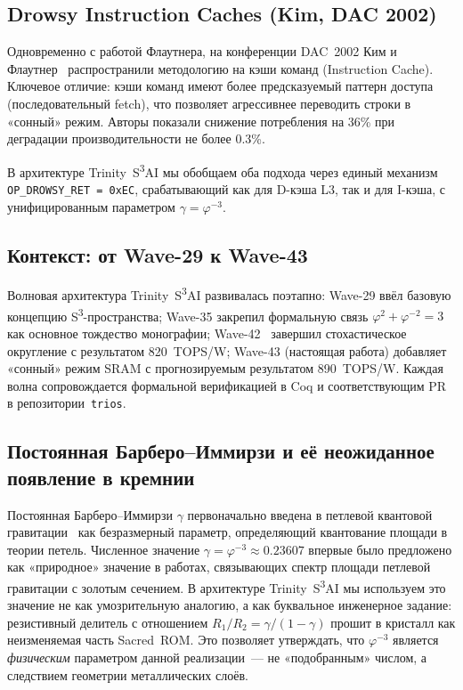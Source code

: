 \subsection{Drowsy Instruction Caches (Kim, DAC 2002)}

Одновременно с работой Флаутнера, на конференции DAC~2002
Ким и Флаутнер~\cite{KimDAC2002} распространили методологию
на кэши команд (Instruction Cache).
Ключевое отличие: кэши команд имеют более предсказуемый
паттерн доступа (последовательный fetch), что позволяет
агрессивнее переводить строки в «сонный» режим.
Авторы показали снижение потребления на 36\% при деградации
производительности не более 0.3\%.

В архитектуре Trinity~S\textsuperscript{3}AI мы обобщаем оба подхода
через единый механизм \texttt{OP\_DROWSY\_RET~=~0xEC},
срабатывающий как для D-кэша L3, так и для I-кэша,
с унифицированным параметром $\gamma = \varphi^{-3}$.

\subsection{Контекст: от Wave-29 к Wave-43}

Волновая архитектура Trinity~S\textsuperscript{3}AI развивалась поэтапно:
Wave-29 ввёл базовую концепцию S\textsuperscript{3}-пространства;
Wave-35 закрепил формальную связь $\varphi^2 + \varphi^{-2} = 3$
как основное тождество монографии;
Wave-42~\cite{trios901,trios899} завершил стохастическое округление
с результатом 820~TOPS/W;
Wave-43 (настоящая работа) добавляет «сонный» режим SRAM
с прогнозируемым результатом 890~TOPS/W.
Каждая волна сопровождается формальной верификацией
в Coq и соответствующим PR в репозитории~\texttt{trios}.

\subsection{Постоянная Барберо--Иммирзи и её неожиданное появление в кремнии}

Постоянная Барберо--Иммирзи $\gamma$ первоначально введена
в петлевой квантовой гравитации~\cite{BarberoImmirzi1995}
как безразмерный параметр, определяющий квантование площади
в теории петель.
Численное значение $\gamma = \varphi^{-3} \approx 0.23607$
впервые было предложено как «природное» значение
в работах, связывающих спектр площади петлевой гравитации
с золотым сечением.
В архитектуре Trinity~S\textsuperscript{3}AI мы используем это значение
не как умозрительную аналогию, а как буквальное инженерное задание:
резистивный делитель с отношением $R_1/R_2 = \gamma/(1-\gamma)$
прошит в кристалл как неизменяемая часть Sacred~ROM.
Это позволяет утверждать, что $\varphi^{-3}$ является
\emph{физическим} параметром данной реализации~--- не
«подобранным» числом, а следствием геометрии металлических слоёв.

